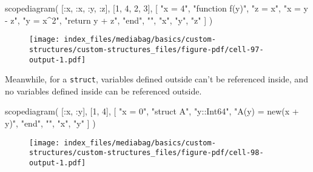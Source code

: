 \documentclass[
  letterpaper,
  DIV=11,
  numbers=noendperiod]{scrreprt}
\newenvironment{Shaded}{\begin{snugshade}}{\end{snugshade}}
\newcommand{\FloatTok}[1]{\textcolor[rgb]{0.68,0.00,0.00}{#1}}
\newcommand{\FunctionTok}[1]{\textcolor[rgb]{0.28,0.35,0.67}{#1}}
\newcommand{\NormalTok}[1]{\textcolor[rgb]{0.00,0.23,0.31}{#1}}
\newcommand{\OperatorTok}[1]{\textcolor[rgb]{0.37,0.37,0.37}{#1}}
\newcommand{\StringTok}[1]{\textcolor[rgb]{0.13,0.47,0.30}{#1}}
\begin{document}
\begin{Shaded}
\begin{Highlighting}[]
\FunctionTok{scopediagram}\NormalTok{(}
\NormalTok{    [}\OperatorTok{:}\NormalTok{x, }\OperatorTok{:}\NormalTok{x, }\OperatorTok{:}\NormalTok{y, }\OperatorTok{:}\NormalTok{z], [}\FloatTok{1}\NormalTok{, }\FloatTok{4}\NormalTok{, }\FloatTok{2}\NormalTok{, }\FloatTok{3}\NormalTok{],}
\NormalTok{    [}
        \StringTok{"x = 4"}\NormalTok{,}
        \StringTok{"function f(y)"}\NormalTok{,}
            \StringTok{"z = x"}\NormalTok{,}
            \StringTok{"x = y {-} z"}\NormalTok{,}
            \StringTok{"y = x\^{}2"}\NormalTok{,}
            \StringTok{"return y + z"}\NormalTok{,}
        \StringTok{"end"}\NormalTok{,}
        \StringTok{""}\NormalTok{,}
        \StringTok{"x"}\NormalTok{,}
        \StringTok{"y"}\NormalTok{,}
        \StringTok{"z"}
\NormalTok{    ]}
\NormalTok{)}
\end{Highlighting}
\end{Shaded}

\begin{figure}[H]

{\centering \texttt{[image: index\_files/mediabag/basics/custom-structures/custom-structures\_files/figure-pdf/cell-97-output-1.pdf]}

}

\end{figure}

Meanwhile, for a \texttt{struct}, variables defined outside can't be
referenced inside, and no variables defined inside can be referenced
outside.

\begin{Shaded}
\begin{Highlighting}[]
\FunctionTok{scopediagram}\NormalTok{(}
\NormalTok{    [}\OperatorTok{:}\NormalTok{x, }\OperatorTok{:}\NormalTok{y], [}\FloatTok{1}\NormalTok{, }\FloatTok{4}\NormalTok{],}
\NormalTok{    [}
        \StringTok{"x = 0"}\NormalTok{,}
        \StringTok{"struct A"}\NormalTok{,}
        \StringTok{"y::Int64"}\NormalTok{,}
        \StringTok{"A(y) = new(x + y)"}\NormalTok{,}
        \StringTok{"end"}\NormalTok{,}
        \StringTok{""}\NormalTok{,}
        \StringTok{"x"}\NormalTok{,}
        \StringTok{"y"}
\NormalTok{    ]}
\NormalTok{)}
\end{Highlighting}
\end{Shaded}

\begin{figure}[H]

{\centering \texttt{[image: index\_files/mediabag/basics/custom-structures/custom-structures\_files/figure-pdf/cell-98-output-1.pdf]}

}

\end{figure}
\end{document}
